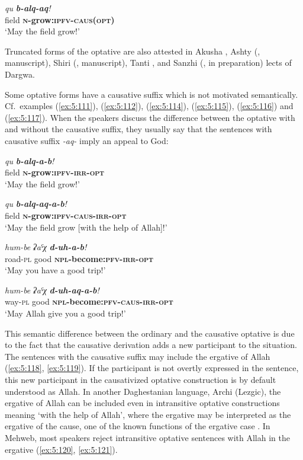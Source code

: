 ﻿\documentclass[output=paper]{langsci/langscibook}
\begin{document}
\ex \label{ex:5:113} %
\gll \emph{qu} \emph{\textbf{b-alq-aq}!}\\
 field \textbf{\textsc{n}-grow:\textsc{ipfv}-\textsc{caus}(\textsc{opt})}\\
\glt `May the field grow!'
\z


Truncated forms of the optative are also attested in Akusha
\citep[34]{vandenberg2001}, Ashty (\citealt{belyaev:ocherk}, manuscript), Shiri
(\citealt{belyaev:shiri}, manuscript), Tanti
\citep{sumbatova-lander2014}, and Sanzhi (\citeauthor{forker:sanzhi},
in preparation) lects of Dargwa.

Some optative forms have a causative suffix which is not motivated
semantically. Cf.\ examples (\ref{ex:5:111}), (\ref{ex:5:112}), (\ref{ex:5:114}), (\ref{ex:5:115}), (\ref{ex:5:116}) and (\ref{ex:5:117}).
When the speakers discuss the difference between the optative with and
without the causative suffix, they usually say that the sentences with
causative suffix \emph{-aq-} imply an appeal to God:

\ea \label{ex:5:114} %
\gll \emph{qu} \emph{\textbf{b-alq-a-b}!}\\
 field \textbf{\textsc{n}-grow:\textsc{ipfv}-\textsc{irr}-\textsc{opt}}\\
\glt `May the field grow!'

\ex \label{ex:5:115} %
\gll \emph{qu} \emph{\textbf{b-alq-aq-a-b}!}\\
 field \textbf{\textsc{n}-grow:\textsc{ipfv}-\textsc{caus}-\textsc{irr}-\textsc{opt}}\\
\glt `May the field grow [with the help of Allah]!'

\ex \label{ex:5:116} %
\gll \emph{hum-be} \emph{ʡaˤχ}  \emph{\textbf{d-uh-a-b}!}\\
 road-\textsc{pl} good \textbf{\textsc{npl}-become:\textsc{pfv}-\textsc{irr}-\textsc{opt}}\\
\glt `May you have a good trip!'

\ex \label{ex:5:117} %
\gll \emph{hum-be} \emph{ʡaˤχ}  \emph{\textbf{d-uh-aq-a-b}!}\\
 way-\textsc{pl} good \textbf{\textsc{npl}-become:\textsc{pfv}-\textsc{caus}-\textsc{irr}-\textsc{opt}}\\
\glt `May Allah give you a good trip!'
\z

This semantic difference between the ordinary and the causative optative
is due to the fact that the causative derivation adds a new participant
to the situation. The sentences with the causative suffix may include
the ergative of Allah (\ref{ex:5:118}, \ref{ex:5:119}). If the participant is not overtly
expressed in the sentence, this new participant in the causativized
optative construction is by default understood as Allah. In another
Daghestanian language, Archi (Lezgic), the ergative of Allah can be
included even in intransitive optative constructions meaning `with the
help of Allah', where the ergative may be interpreted as the ergative of
the cause, one of the known functions of the ergative case \citep{dobrushina2011}.
In Mehweb, most speakers reject intransitive optative sentences
with Allah in the ergative (\ref{ex:5:120}, \ref{ex:5:121}).
\end{document}
